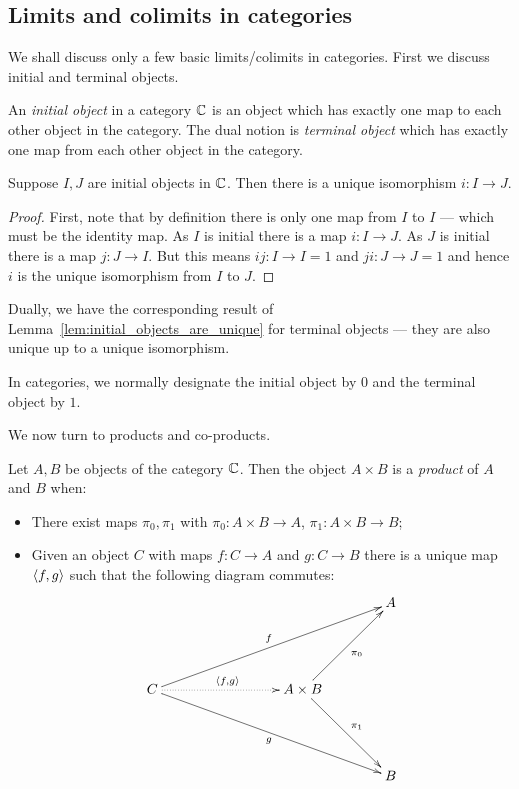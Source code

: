 \subsection{Limits and colimits in categories} %
\label{sub:limits_and_colimits_in_categories}

We shall discuss only a few basic limits/colimits in categories. First we discuss initial
and terminal objects.

\begin{definition}\label{def:initial_object}
  An \emph{initial object} in a category $\mathbb{C}$ is an object which has exactly one map to each other
  object in the category. The dual notion is \emph{terminal object} which has exactly one map from
  each other object in the category.
\end{definition}


\begin{lemma}\label{lem:initial_objects_are_unique}
  Suppose $I,J$ are initial objects in $\mathbb{C}$. Then there is a unique isomorphism $i:I \to J$.
\end{lemma}
\begin{proof}
  First, note that by definition there is only one map from $I$ to $I$ --- which must be the
  identity map. As $I$ is initial there is a map $i: I \to J$. As $J$ is initial there is a map
  $j:J \to I$. But this means $i j : I \to I = 1$ and $j i : J \to J = 1$ and hence $i$ is the
  unique isomorphism from $I$ to $J$.
\end{proof}

Dually, we have the corresponding result of Lemma~\ref{lem:initial_objects_are_unique} for terminal
objects --- they are also unique up to a unique isomorphism.

In categories, we normally designate the initial object by $0$ and the terminal object by $1$.

We now turn to products and co-products.

\begin{definition}\label{def:categorical_product}
  Let $A,B$ be objects of the category $\mathbb{C}$. Then the object $A \times B$ is a \emph{product} of
  $A$ and $B$ when:
  \begin{itemize}
    \item There exist maps $\pi_0, \pi_1$ with $\pi_0:A\times B \to A$, $\pi_1:A\times B \to B$;
    \item Given an object $C$ with maps $f:C\to A$ and $g:C \to B$ there is a unique map
    $\langle f,g\rangle$ such that the following diagram commutes:
    \[
      \xymatrix@C+15pt@R+25pt{
        &&&A\\
        C\ar[urrr]^{f} \ar[drrr]_{g}\ar@{.>}[rr]^{\<f,g\>} & &A\times B \ar[ur]_{\pi_0}\ar[dr]^{\pi_1}\\
        &&&B
      }
    \]
  \end{itemize}

\end{definition}

